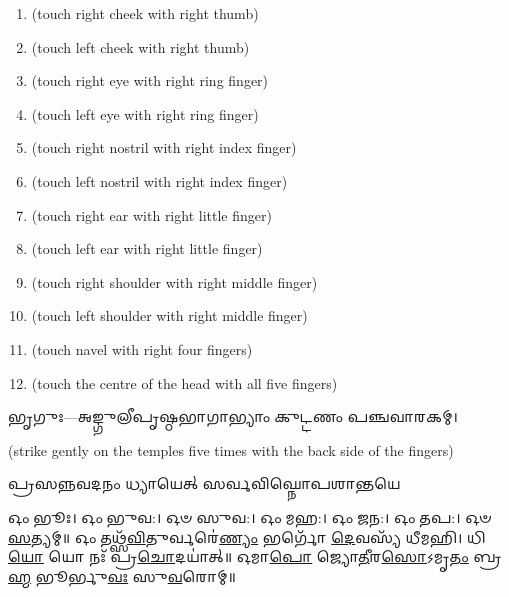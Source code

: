 \begin{enumerate}
    \item {} {\scriptsize (touch right cheek with right thumb)}
    \item {} {\scriptsize (touch left cheek with right thumb)}
    \item {} {\scriptsize (touch right eye with right ring finger)}
    \item {} {\scriptsize (touch left eye with right ring finger)}
    \item {} {\scriptsize (touch right nostril with right index finger)}
    \item {} {\scriptsize (touch left nostril with right index finger)}
    \item {} {\scriptsize (touch right ear with right little finger)}
    \item {} {\scriptsize (touch left ear with right little finger)}
    \item {} {\scriptsize (touch right shoulder with right middle finger)}
    \item {} {\scriptsize (touch left shoulder with right middle finger)}
    \item {} {\scriptsize (touch navel with right four fingers)}
    \item {} {\scriptsize (touch the centre of the head with all five fingers)}
\end{enumerate}



𑌭𑍃𑌗𑍁𑌃—𑌅𑌙𑍍𑌗𑍁𑌲𑍀𑌪𑍃𑌷𑍍𑌠𑌭𑌾𑌗𑌾𑌭𑍍𑌯𑌾𑌂 𑌕𑍁𑌟𑍍𑌟𑌣𑌂 𑌪𑌞𑍍𑌚𑌵𑌾𑌰𑌕𑌮𑍍।

{\scriptsize (strike gently on the temples five times with the back side of the fingers)}

{𑌪𑍍𑌰𑌸𑌨𑍍𑌨𑌵𑌦𑌨𑌂 𑌧𑍍𑌯𑌾𑌯𑍇𑌤𑍍 𑌸𑌰𑍍𑌵𑌵𑌿𑌘𑍍𑌨𑍋𑌪𑌶𑌾𑌨𑍍𑌤𑌯𑍇}


𑌓𑌂 𑌭𑍂𑌃। 𑌓𑌂 𑌭𑍁𑌵:। 𑌓𑍞 𑌸𑍁𑌵:। 𑌓𑌂 𑌮𑌹:। 𑌓𑌂 𑌜𑌨:। 𑌓𑌂 𑌤𑌪:। 𑌓𑍞 \ul{𑌸}\-𑌤𑍍𑌯𑌮𑍍॥
𑌓𑌂 𑌤𑌥𑍍𑌸᳴\-\ul{𑌵𑌿}\-𑌤𑍁𑌰𑍍𑌵𑌰𑍇॑\-\ul{𑌣𑍍𑌯𑌂} 𑌭𑌰𑍍𑌗𑍋᳴ \ul{𑌦𑍇}\-𑌵𑌸𑍍𑌯᳴ 𑌧𑍀𑌮𑌹𑌿। 𑌧𑌿\-\ul{𑌯𑍋} 𑌯𑍋 𑌨𑌃᳴ 𑌪𑍍𑌰\-\ul{𑌚𑍋}\-𑌦𑌯𑌾॑𑌤𑍍॥
𑌓𑌮𑌾\-\ul{𑌪𑍋} 𑌜𑍍𑌯𑍋\-\ul{𑌤𑍀}\-𑌰\-\ul{𑌸𑍋}\-𑌽𑌮𑍃\-\ul{𑌤𑌂} 𑌬𑍍𑌰\-\ul{𑌹𑍍𑌮} 𑌭𑍂𑌰𑍍𑌭𑍁\-\ul{𑌵𑌃} 𑌸𑍁\-\ul{𑌵}\-𑌰𑍋𑌮𑍍॥


